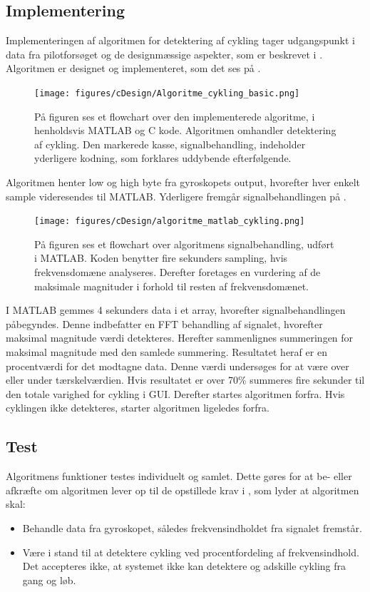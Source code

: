 \subsection{Implementering}
Implementeringen af algoritmen for detektering af cykling tager udgangspunkt i data fra pilotforsøget og de designmæssige aspekter, som er beskrevet i . Algoritmen er designet og implementeret, som det ses på .
\begin{figure}[H]
	\centering
	\texttt{[image: figures/cDesign/Algoritme\_cykling\_basic.png]}
	\caption{På figuren ses et flowchart over den implementerede algoritme, i henholdsvis MATLAB og C kode. Algoritmen omhandler detektering af cykling. Den markerede kasse, signalbehandling, indeholder yderligere kodning, som forklares uddybende efterfølgende.}
	\label{fig:basic_cykling}
\end{figure}\vspace{-0.25cm}
Algoritmen henter low og high byte fra gyroskopets output, hvorefter hver enkelt sample videresendes til MATLAB. Yderligere fremgår signalbehandlingen på .
\begin{figure}[H]
	\centering
	\texttt{[image: figures/cDesign/algoritme\_matlab\_cykling.png]}
	\caption{På figuren ses et flowchart over algoritmens signalbehandling, udført i MATLAB. Koden benytter fire sekunders sampling, hvis frekvensdomæne analyseres. Derefter foretages en vurdering af de maksimale magnituder i forhold til resten af frekvensdomænet.}
	\label{fig:matlab_cykling}
\end{figure}\vspace{-0.25cm}
I MATLAB gemmes 4 sekunders data i et array, hvorefter signalbehandlingen påbegyndes. Denne indbefatter en FFT behandling af signalet, hvorefter maksimal magnitude værdi detekteres. Herefter sammenlignes summeringen for maksimal magnitude med den samlede summering. Resultatet heraf er en procentværdi for det modtagne data. Denne værdi undersøges for at være over eller under tærskelværdien. Hvis resultatet er over 70\% summeres fire sekunder til den totale varighed for cykling i GUI. Derefter startes algoritmen forfra. Hvis cyklingen ikke detekteres, starter algoritmen ligeledes forfra. 

\subsection{Test}
Algoritmens funktioner testes individuelt og samlet. Dette gøres for at be- eller afkræfte om algoritmen lever op til de opstillede krav i , som lyder at algoritmen skal:
\begin{itemize}
	\item Behandle data fra gyroskopet, således frekvensindholdet fra signalet fremstår.
	\item Være i stand til at detektere cykling ved procentfordeling af frekvensindhold. Det accepteres ikke, at systemet ikke kan detektere og adskille cykling fra gang og løb.
\end{itemize}

